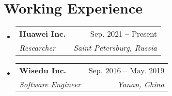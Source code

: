 \documentclass[letterpaper,10pt]{article}
\makeatletter
\newcommand{\resumeItem}[1]{
  \item\small{
    {#1 \vspace{-2pt}}
  }
}
\newcommand{\resumeSubheading}[4]{
  \vspace{-2pt}\item
  \begin{tabular*}{0.97\textwidth}[t]{l@{\extracolsep{\fill}}r}
    \textbf{#1} & #2 \\
    \textit{\small#3} & \textit{\small #4} \\
  \end{tabular*}\vspace{-7pt}
}
\newenvironment{resumeSubHeadingList}{\begin{itemize}[leftmargin=0.15in, label={}]}{\end{itemize}}
\newenvironment{resumeItemList}{\begin{itemize}}{\end{itemize}}
\makeatother
\begin{document}
\section{Working Experience}
\begin{resumeSubHeadingList}

  \resumeSubheading
    {Huawei Inc.}{Sep. 2021 -- Present}
    {Researcher}{Saint Petersburg, Russia}
    \vspace{2pt}
  \resumeSubheading
    {Wisedu Inc.}{Sep. 2016 -- May. 2019}
    {Software Engineer}{Yanan, China}



\end{resumeSubHeadingList}
\end{document}

